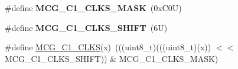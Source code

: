 \begin{DoxyCompactItemize}
\mbox{\label{group___m_c_g___register___masks_gae9a1db29d56ef219e4df3dc9d945b08e}} 
\#define {\bfseries M\+C\+G\+\_\+\+C1\+\_\+\+C\+L\+K\+S\+\_\+\+M\+A\+SK}~(0x\+C0\+U)
\item 
\mbox{\label{group___m_c_g___register___masks_ga9ca1068f336097a94984ba4bba0798d6}} 
\#define {\bfseries M\+C\+G\+\_\+\+C1\+\_\+\+C\+L\+K\+S\+\_\+\+S\+H\+I\+FT}~(6\+U)
\item 
\#define \mbox{\hyperlink{group___m_c_g___register___masks_gaffe61ac58c90dfaebbd4748c0dea558c}{M\+C\+G\+\_\+\+C1\+\_\+\+C\+L\+KS}}(x)~(((uint8\+\_\+t)(((uint8\+\_\+t)(x)) $<$$<$ M\+C\+G\+\_\+\+C1\+\_\+\+C\+L\+K\+S\+\_\+\+S\+H\+I\+FT)) \& M\+C\+G\+\_\+\+C1\+\_\+\+C\+L\+K\+S\+\_\+\+M\+A\+SK)
\end{DoxyCompactItemize}
